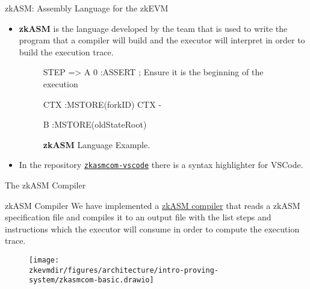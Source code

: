 \begin{frame}[fragile]{zkASM: Assembly Language for the zkEVM}
\begin{itemize}

\item \textbf{zkASM} is the language developed by the team that is used to write the program that a compiler will build and the executor will interpret in order to build the execution trace.

\vspace{1em}

\begin{figure}
\begin{zkasm}
STEP => A
0                                   :ASSERT ; Ensure it is the beginning of the execution

CTX                                 :MSTORE(forkID)
CTX - %

B                                   :MSTORE(oldStateRoot)
\end{zkasm}
\textbf{zkASM} Language Example.
\end{figure}

\vspace{1em}

\item In the repository \href{https://github.com/0xPolygonHermez/zkasmcom-vscode}{\texttt{zkasmcom-vscode}} there is a syntax highlighter for VSCode.

\end{itemize}
\end{frame}






\begin{frame}{The zkASM Compiler}

\begin{block}{zkASM Compiler}
We have implemented a \href{https://github.com/0xPolygonHermez/zkasmcom}{zkASM compiler} that reads a zkASM specification file and compiles it to an output file with the list steps and instructions which the executor will consume in order to compute the execution trace.
\end{block}

\begin{figure}
\texttt{[image: \\zkevmdir/figures/architecture/intro-proving-system/zkasmcom-basic.drawio]}
\end{figure}

\end{frame}







